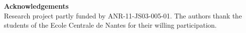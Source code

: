 \documentclass[twoside,twocolumn]{article}
\begin{document}
\noindent \textbf{Acknowledgements}\\
\setlength{\parindent}{0.7cm} 
Research project partly funded by ANR-11-JS03-005-01. The authors thank the students of the Ecole Centrale de Nantes for their willing participation.



\end{document}
